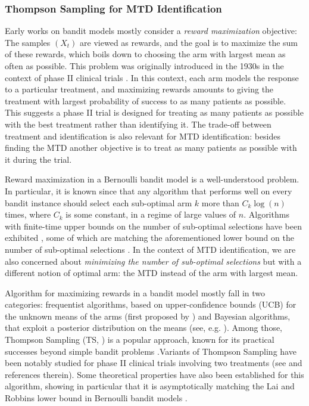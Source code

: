 \subsubsection{Thompson Sampling for MTD Identification}

Early works on bandit models \citep{Robbins52,LaiRobbins85bandits} mostly consider a \emph{reward maximization} objective: The samples $(X_t)$ are viewed as rewards, and the goal is to maximize the sum of these rewards, which boils down to choosing the arm with largest mean as often as possible. This problem was originally introduced in the 1930s in the context of phase II clinical trials \citep{Thompson33}. In this context, each arm models the response to a particular treatment, and maximizing rewards amounts to giving the treatment with largest probability of success to as many patients as possible. This suggests a phase II trial is designed for treating as many patients as possible with the best treatment rather than identifying it. The trade-off between treatment and identification is also relevant for MTD identification: besides finding the MTD another objective is to treat as many patients as possible with it during the trial.

Reward maximization in a Bernoulli bandit model is a well-understood problem. In particular, it is known since \citep{LaiRobbins85bandits} that any algorithm that performs well on every bandit instance should select each sub-optimal arm $k$ more than $C_k\log(n)$ times, where $C_k$ is some constant, in a regime of large values of $n$. Algorithms with finite-time upper bounds on the number of sub-optimal selections have been exhibited \citep{Aueral02,Audibertal09UCBV}, some of which are matching the aforementioned lower bound on the number of sub-optimal selections \citep{KLUCBJournal}. In the context of MTD identification, we are also concerned about \emph{ minimizing the number of sub-optimal selections} but with a different notion of optimal arm: the MTD instead of the arm with largest mean. 

Algorithm for maximizing rewards in a bandit model mostly fall in two categories: frequentist algorithms, based on upper-confidence bounds (UCB) for the unknown means of the arms (first proposed by \cite{KatRob:95Gauss,Aueral02}) and Bayesian algorithms, that exploit a posterior distribution on the means (see, e.g. \cite{AISTATS12}). Among those, Thompson Sampling (TS, \citep{Thompson33}) is a popular approach, known for its practical successes beyond simple bandit problems \citep{AGContext13,Agrawal17TSRL}.Variants of Thompson Sampling have been notably studied for phase II clinical trials involving two treatments (see \cite{Thall07} and references therein). Some theoretical properties have also been established for this algorithm, showing in particular that it is asymptotically matching the Lai and Robbins lower bound in Bernoulli bandit models \citep{ALT12,AGAISTAT13}. 


